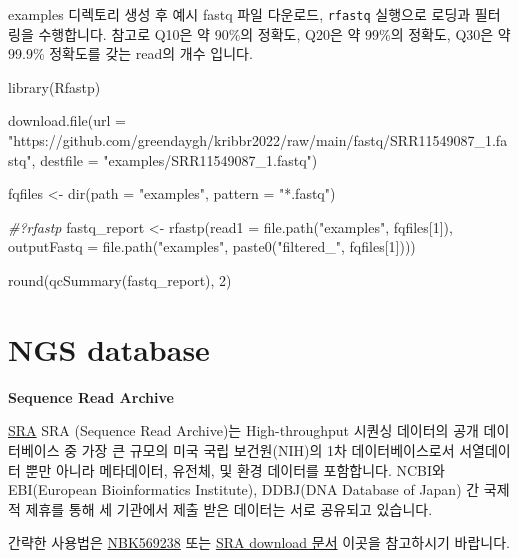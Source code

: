 \documentclass[
]{book}
\newenvironment{Shaded}{\begin{snugshade}}{\end{snugshade}}
\newcommand{\AttributeTok}[1]{\textcolor[rgb]{0.77,0.63,0.00}{#1}}
\newcommand{\CommentTok}[1]{\textcolor[rgb]{0.56,0.35,0.01}{\textit{#1}}}
\newcommand{\DecValTok}[1]{\textcolor[rgb]{0.00,0.00,0.81}{#1}}
\newcommand{\FunctionTok}[1]{\textcolor[rgb]{0.00,0.00,0.00}{#1}}
\newcommand{\NormalTok}[1]{#1}
\newcommand{\OtherTok}[1]{\textcolor[rgb]{0.56,0.35,0.01}{#1}}
\newcommand{\StringTok}[1]{\textcolor[rgb]{0.31,0.60,0.02}{#1}}
\begin{document}
examples 디렉토리 생성 후 예시 fastq 파일 다운로드, \texttt{rfastq} 실행으로 로딩과 필터링을 수행합니다. 참고로 Q10은 약 90\%의 정확도, Q20은 약 99\%의 정확도, Q30은 약 99.9\% 정확도를 갖는 read의 개수 입니다.

\begin{Shaded}
\begin{Highlighting}[]
\FunctionTok{library}\NormalTok{(Rfastp)}

\FunctionTok{download.file}\NormalTok{(}\AttributeTok{url =} \StringTok{"https://github.com/greendaygh/kribbr2022/raw/main/fastq/SRR11549087\_1.fastq"}\NormalTok{, }\AttributeTok{destfile =} \StringTok{"examples/SRR11549087\_1.fastq"}\NormalTok{)}

\NormalTok{fqfiles }\OtherTok{\textless{}{-}} \FunctionTok{dir}\NormalTok{(}\AttributeTok{path =} \StringTok{"examples"}\NormalTok{, }\AttributeTok{pattern =} \StringTok{"*.fastq"}\NormalTok{)}

\CommentTok{\#?rfastp}
\NormalTok{fastq\_report }\OtherTok{\textless{}{-}} \FunctionTok{rfastp}\NormalTok{(}\AttributeTok{read1 =} \FunctionTok{file.path}\NormalTok{(}\StringTok{"examples"}\NormalTok{, fqfiles[}\DecValTok{1}\NormalTok{]), }
                       \AttributeTok{outputFastq =} \FunctionTok{file.path}\NormalTok{(}\StringTok{"examples"}\NormalTok{, }\FunctionTok{paste0}\NormalTok{(}\StringTok{"filtered\_"}\NormalTok{, fqfiles[}\DecValTok{1}\NormalTok{])))}

\FunctionTok{round}\NormalTok{(}\FunctionTok{qcSummary}\NormalTok{(fastq\_report), }\DecValTok{2}\NormalTok{)}
\end{Highlighting}
\end{Shaded}

\hypertarget{ngs-database}{%
\section{NGS database}\label{ngs-database}}

\textbf{Sequence Read Archive}

\href{https://www.ncbi.nlm.nih.gov/sra}{SRA} SRA (Sequence Read Archive)는 High-throughput 시퀀싱 데이터의 공개 데이터베이스 중 가장 큰 규모의 미국 국립 보건원(NIH)의 1차 데이터베이스로서 서열데이터 뿐만 아니라 메타데이터, 유전체, 및 환경 데이터를 포함합니다. NCBI와 EBI(European Bioinformatics Institute), DDBJ(DNA Database of Japan) 간 국제적 제휴를 통해 세 기관에서 제출 받은 데이터는 서로 공유되고 있습니다.

간략한 사용법은 \href{https://www.ncbi.nlm.nih.gov/books/NBK569238/}{NBK569238} 또는 \href{https://www.ncbi.nlm.nih.gov/sra/docs/sradownload/}{SRA download 문서} 이곳을 참고하시기 바랍니다.
\end{document}
